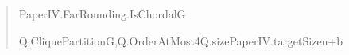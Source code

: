 \documentclass[english,11pt,a4paper]{article}
\newlength{\LeanCharWidth}
\begin{document}
\begin{quote}
\noindent \hspace*{\dimexpr 6\LeanCharWidth\relax}PaperIV.FarRounding.IsChordal\hspace*{\dimexpr 1\LeanCharWidth\relax}G\hspace*{\dimexpr 1\LeanCharWidth\relax}{\LeanSymbols →}\par
\noindent \hspace*{\dimexpr 8\LeanCharWidth\relax}{\LeanSymbols ∃}\hspace*{\dimexpr 1\LeanCharWidth\relax}Q\hspace*{\dimexpr 1\LeanCharWidth\relax}:\hspace*{\dimexpr 1\LeanCharWidth\relax}CliquePartition\hspace*{\dimexpr 1\LeanCharWidth\relax}G,\hspace*{\dimexpr 1\LeanCharWidth\relax}Q.OrderAtMost\hspace*{\dimexpr 1\LeanCharWidth\relax}4\hspace*{\dimexpr 1\LeanCharWidth\relax}{\LeanSymbols ∧}\hspace*{\dimexpr 1\LeanCharWidth\relax}Q.size\hspace*{\dimexpr 1\LeanCharWidth\relax}{\LeanSymbols ≤}\hspace*{\dimexpr 1\LeanCharWidth\relax}PaperIV.targetSize\hspace*{\dimexpr 1\LeanCharWidth\relax}n\hspace*{\dimexpr 1\LeanCharWidth\relax}+\hspace*{\dimexpr 1\LeanCharWidth\relax}b\par
\end{quote}
\end{document}
